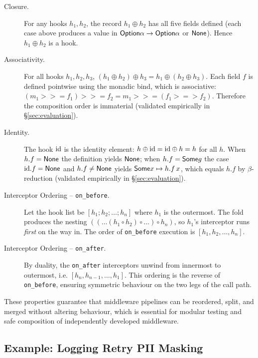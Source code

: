 \begin{description}
\item[Closure.]  For any hooks $h_1, h_2$, the record $h_1 \oplus h_2$ has
  all five fields defined (each case above produces a value in
  $\mathsf{Option}{\alpha\to\mathsf{Option}{\alpha}}$ or $\mathsf{None}$).  Hence $h_1 \oplus h_2$
  is a hook.

\item[Associativity.]  For all hooks $h_1, h_2, h_3$,
  $(h_1 \oplus h_2) \oplus h_3 = h_1 \oplus (h_2 \oplus h_3)$.
  Each field $f$ is defined pointwise using the monadic bind, which is
  associative: $(m_1 >>= f_1) >>= f_2 = m_1 >>= (f_1 >=> f_2)$.  Therefore the
  composition order is immaterial (validated empirically in
  \S\ref{sec:evaluation}).

\item[Identity.]  The hook $\mathrm{id}$ is the identity element:
  $h \oplus \mathrm{id} = \mathrm{id} \oplus h = h$ for all $h$.  When $h.f = \mathsf{None}$ the
  definition yields $\mathsf{None}$; when $h.f = \mathsf{Some}{g}$ the case
  $\mathrm{id}.f = \mathsf{None}$ and $h.f \neq \mathsf{None}$ yields $\mathsf{Some}{x \mapsto h.f\,x}$,
  which equals $h.f$ by $\beta$-reduction (validated empirically in
  \S\ref{sec:evaluation}).

\item[Interceptor Ordering -- \texttt{on\_before}.]  Let the hook list be
  $[h_1; h_2; \dots; h_n]$ where $h_1$ is the outermost.  The fold
  produces the nesting $((\dots(h_1 \circ h_2) \circ \dots) \circ h_n)$,
  so $h_1$'s interceptor runs \emph{first} on the way in.  The order of
  \texttt{on\_before} execution is $[h_1, h_2, \dots, h_n]$.

\item[Interceptor Ordering -- \texttt{on\_after}.]  By duality, the
  \texttt{on\_after} interceptors unwind from innermost to outermost, i.e.
  $[h_n, h_{n-1}, \dots, h_1]$.  This ordering is the reverse of
  \texttt{on\_before}, ensuring symmetric behaviour on the two legs of the
  call path.
\end{description}

These properties guarantee that middleware pipelines can be reordered,
split, and merged without altering behaviour, which is essential for
modular testing and safe composition of independently developed middleware.

\subsection{Example: Logging {\textrightarrow} Retry {\textrightarrow} PII Masking}\label{sec:middleware-example}

